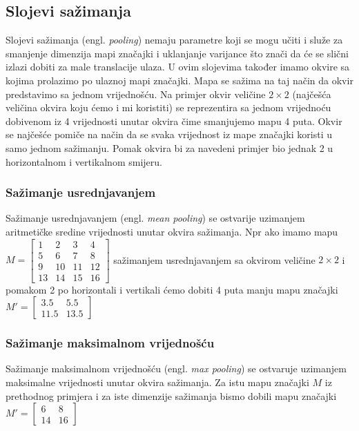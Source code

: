 \documentclass[times, utf8, zavrsni]{fer}
\begin{document}
\subsection{Slojevi sažimanja}
Slojevi sažimanja (engl. \textit{pooling}) nemaju parametre koji se mogu učiti i služe za smanjenje dimenzija mapi značajki i uklanjanje varijance što znači da će se slični izlazi dobiti za male translacije ulaza. U ovim slojevima također imamo okvire sa kojima prolazimo po ulaznoj mapi značajki. Mapa se sažima na taj način da okvir predstavimo sa jednom vrijednošću. Na primjer okvir veličine $2 \times 2$ (najčešća veličina okvira koju ćemo i mi koristiti) se reprezentira sa jednom vrijednoću dobivenom iz 4 vrijednosti unutar okvira čime smanjujemo mapu 4 puta. Okvir se najčešće pomiče na način da se svaka vrijednost iz mape značajki koristi u samo jednom sažimanju. Pomak okvira bi za navedeni primjer bio jednak 2 u horizontalnom i vertikalnom smijeru.
\subsubsection{Sažimanje usrednjavanjem}
Sažimanje usrednjavanjem (engl. \textit{mean pooling}) se ostvarije uzimanjem aritmetičke sredine vrijednosti unutar okvira sažimanja. Npr ako imamo mapu $M = \left[
\begin{matrix}
1 & 2 & 3 & 4 \\
5 & 6 & 7 & 8 \\ 
9 & 10 & 11 & 12 \\
13 & 14 & 15 & 16
\end{matrix} \right]
$
sažimanjem usrednjavanjem sa okvirom veličine $2 \times 2$ i pomakom 2 po horizontali i vertikali ćemo dobiti 4 puta manju mapu značajki $M' = \left[
\begin{matrix}
3.5 & 5.5 \\
11.5 & 13.5
\end{matrix} \right]
$

\subsubsection{Sažimanje maksimalnom vrijednošću}
Sažimanje maksimalnom vrijednošću (engl. \textit{max pooling}) se ostvaruje uzimanjem maksimalne vrijednosti unutar okvira sažimanja. Za istu mapu značajki $M$ iz prethodnog primjera i za iste dimenzije sažimanja bismo dobili mapu značajki $M' = \left[
\begin{matrix}
6 & 8 \\
14 & 16
\end{matrix} \right]
$
\end{document}
